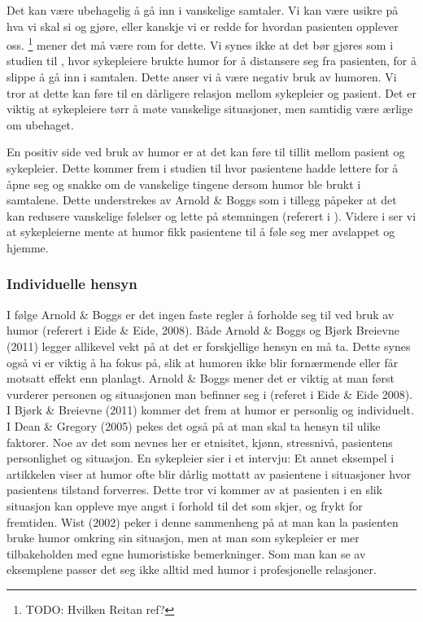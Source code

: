 Det kan være ubehagelig å gå inn i vanskelige samtaler. Vi kan være usikre på
hva vi skal si og gjøre, eller kanskje vi er redde for hvordan pasienten
opplever oss. \footnote{TODO: Hvilken Reitan
ref?} mener det må være rom for dette. Vi synes ikke at det bør gjøres som i
studien til , hvor sykepleiere brukte humor for å distansere
seg fra pasienten, for å slippe å gå inn i samtalen.  Dette anser vi å være
negativ bruk av humoren. Vi tror at dette kan føre til en dårligere relasjon
mellom sykepleier og pasient. Det er viktig at sykepleiere tørr å møte
vanskelige situasjoner, men samtidig være ærlige om ubehaget.

En positiv side ved bruk av humor er at det kan føre til tillit mellom pasient
og sykepleier. Dette kommer frem i studien til  hvor
pasientene hadde lettere for å åpne seg og snakke om de vanskelige tingene
dersom humor ble brukt i samtalene. Dette understrekes av Arnold \&{} Boggs som
i tillegg påpeker at det kan redusere vanskelige følelser og lette på
stemningen (referert i ). Videre i  ser vi at
sykepleierne mente at humor fikk pasientene til å føle seg mer avslappet og
hjemme.

\subsubsection{Individuelle hensyn}

I følge Arnold \&{} Boggs er det ingen faste regler å forholde seg til ved bruk av
humor (referert i Eide \&{} Eide, 2008). Både Arnold \&{} Boggs og Bjørk Breievne
(2011) legger allikevel vekt på at det er forskjellige hensyn en må ta. Dette
synes også vi er viktig å ha fokus på, slik at humoren ikke blir fornærmende
eller får motsatt effekt enn planlagt. Arnold \&{} Boggs mener det er viktig at
man først vurderer personen og situasjonen man befinner seg i (referet i Eide \&
Eide 2008). I Bjørk \&{} Breievne (2011) kommer det frem at humor er personlig og
individuelt. I Dean \&{} Gregory (2005) pekes det også på at man skal ta hensyn
til ulike faktorer. Noe av det som nevnes her er etnisitet, kjønn, stressnivå,
pasientens personlighet og situasjon. En sykepleier sier i et intervju:
 Et annet
eksempel i artikkelen viser at humor ofte blir dårlig mottatt av pasientene i
situasjoner hvor pasientens tilstand forverres. Dette tror vi kommer av at
pasienten i en slik situasjon kan oppleve mye angst i forhold til det som
skjer, og frykt for fremtiden. Wist (2002) peker i denne sammenheng på at man
kan la pasienten bruke humor omkring sin situasjon, men at man som sykepleier
er mer tilbakeholden med egne humoristiske bemerkninger. Som man kan se av
eksemplene passer det seg ikke alltid med humor i profesjonelle relasjoner.

